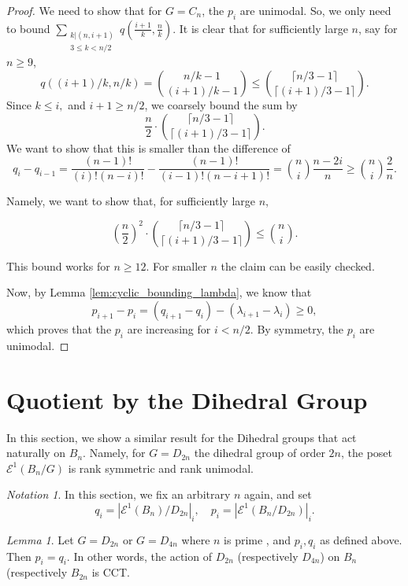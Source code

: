 \documentclass[10 pt]{amsart}
\theoremstyle{plain}
\theoremstyle{definition}
\theoremstyle{remark}
\numberwithin{equation}{section}
\newtheorem{lem}[thm]{Lemma}
\theoremstyle{remark}
\newtheorem{note}[thm]{Notation}
\newcommand{\dstyle}{\displaystyle}
\begin{document}
\begin{proof}

We need to show that for $G= C_n$, the $p_i$ are unimodal. So, we only need to bound $ \dstyle \sum_{\substack{k | (n , i+1)\\ 3 \le k < n/2 }} q (\frac{i+1}{k}, \frac{n}{k}) $. It is clear that for sufficiently large $n$, say for $n \ge 9$, $$q((i+1)/k, n/k) = {n/k - 1 \choose (i+1)/k -1} \le {\lceil n/3-1 \rceil \choose \lceil (i+1)/3 -1 \rceil }.$$ Since $k \leq i,$ and $ i+1 \ge n/2$, we coarsely bound the sum by $$\frac{n}{2} \cdot {\lceil n/3-1 \rceil \choose \lceil (i+1)/3 -1 \rceil }. $$ We want to show that this is smaller than the difference of $$q_i - q_{i-1} = \frac{(n-1)!}{(i)! (n-i)!} - \frac{(n-1)!}{(i-1)!(n-i+1)!}= {n \choose i } \frac{n-2i}{n} \ge  {n \choose i } \frac{2}{n} .$$

Namely, we want to show that, for sufficiently large $n$, 

$$ \left(\frac{n}{2}\right)^2 \cdot {\lceil n/3-1 \rceil \choose \lceil (i+1)/3 -1 \rceil }  \le   {n \choose i}.$$

This bound works for $n \ge 12$. For smaller $n$ the claim can be easily checked. 

Now, by Lemma \ref{lem:cyclic_bounding_lambda}, we know that $$p_{i+1} - p_{i} =  (q_{i+1} - q_i) - (\lambda_{i+1}- \lambda_i) \ge 0,$$  which proves that the $p_i$ are increasing for $i < n/2$. By symmetry, the $p_i$ are unimodal.

\end{proof}


\section{Quotient by the Dihedral Group}
\label{sec:dihedral}

In this section, we show a similar result for the Dihedral groups that act naturally on $B_n$. Namely, for $G = D_{2n}$ the dihedral group of order $2n$, the poset $\mathcal E^1(B_n/G)$ is rank symmetric and rank unimodal.


\begin{note} In this section, we fix an arbitrary $n$ again, and set $$q_i = |\mathcal E^1 (B_n)/D_{2n}|_{i}, \quad p_i = |\mathcal E^1(B_n/D_{2n})|_{i}. $$ 
\end{note}


\begin{lem}{\label{lem:dihedral_prime}}
Let $G = D_{2n}$ or $G = D_{4n}$ where $n$ is prime , and $p_i, q_i$ as defined above. Then $p_i = q_i$. In other words, the action of $D_{2n}$ (respectively $D_{4n}$) on $B_n$ (respectively $B_{2n}$ is CCT. 
\end{lem}
\end{document}
